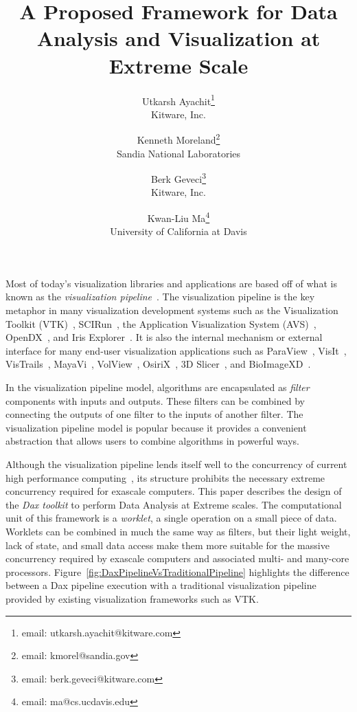 \documentclass{vgtc}                          %
\title{A Proposed Framework for Data Analysis and Visualization at Extreme Scale}
\author{
  Utkarsh Ayachit\thanks{email: utkarsh.ayachit@kitware.com} \\ %
  \scriptsize Kitware, Inc. %
  \and %
  Kenneth Moreland\thanks{email: kmorel@sandia.gov} \\ %
  \scriptsize Sandia National Laboratories %
  \and %
  Berk Geveci\thanks{email: berk.geveci@kitware.com} \\ %
  \scriptsize Kitware, Inc. %
  \and %
  Kwan-Liu Ma\thanks{email: ma@cs.ucdavis.edu} \\ %
  \scriptsize University of California at Davis %
}
\newcommand*{\lcite}[1]{~\cite{#1}}
\newcommand*{\keyterm}[1]{\emph{#1}}
\begin{document}


\maketitle

\label{sec:Introduction}

Most of today's visualization libraries and applications are based off of
what is known as the \keyterm{visualization
  pipeline}\lcite{Haeberli88,Lucas92}.  The visualization pipeline is the
key metaphor in many visualization development systems such as the
Visualization Toolkit (VTK)\lcite{VTKBook}, SCIRun\lcite{SCIRunPaper}, the
Application Visualization System (AVS)\lcite{AVSPaper},
OpenDX\lcite{OpenDXPaper}, and Iris Explorer\lcite{IRISExplorerPaper}.  It
is also the internal mechanism or external interface for many end-user
visualization applications such as ParaView\lcite{ParaViewGuideBook},
VisIt\lcite{VisItBook}, VisTrails\lcite{VisTrailsPaper},
MayaVi\lcite{MayaViPaper}, VolView\lcite{VolViewBook},
OsiriX\lcite{OsiriXPaper}, 3D Slicer\lcite{3DSlicerPaper}, and
BioImageXD\lcite{BioImageXDPaper}.

In the visualization pipeline model, algorithms are encapsulated as
\keyterm{filter} components with inputs and outputs.  These filters can
be combined by connecting the outputs of one filter to the inputs of
another filter.  The visualization pipeline model is popular because it
provides a convenient abstraction that allows users to combine algorithms
in powerful ways.

Although the visualization pipeline lends itself well to the concurrency of
current high performance
computing\lcite{Moreland08,Patchett09,Pugmire08,White05}, its structure
prohibits the necessary extreme concurrency required for exascale
computers.  This paper describes the design of the \keyterm{Dax toolkit} to
perform Data Analysis at Extreme scales.  The computational unit of this
framework is a \keyterm{worklet}, a single operation on a small piece of data.
Worklets can be combined in much the same way as filters, but their light
weight, lack of state, and small data access make them more suitable for
the massive concurrency required by exascale computers and associated
multi- and many-core processors.
Figure~\ref{fig:DaxPipelineVsTraditionalPipeline} highlights the difference
between a Dax pipeline
execution with a traditional visualization pipeline provided by existing
visualization frameworks such as VTK.
\end{document}
